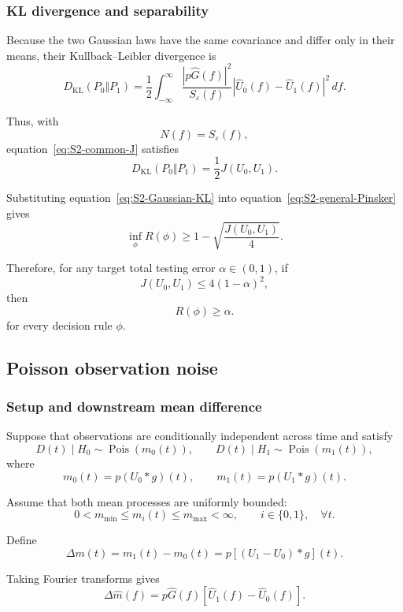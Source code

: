 \subsubsection{KL divergence and separability}

Because the two Gaussian laws have the same covariance and differ
only in their means, their Kullback--Leibler divergence is
\[
D_{\mathrm{KL}}(P_0\Vert P_1)
=
\frac{1}{2}
\int_{-\infty}^{\infty}
\frac{
|p\widehat G(f)|^2
}{
S_\varepsilon(f)
}
\left|
\widehat U_0(f)-\widehat U_1(f)
\right|^2
\,df.
\]

Thus, with
\[
N(f)=S_\varepsilon(f),
\]
equation~\eqref{eq:S2-common-J} satisfies
\begin{equation}
\label{eq:S2-Gaussian-KL}
D_{\mathrm{KL}}(P_0\Vert P_1)
=
\frac{1}{2}J(U_0,U_1).
\end{equation}

Substituting equation~\eqref{eq:S2-Gaussian-KL} into
equation~\eqref{eq:S2-general-Pinsker} gives
\[
\inf_{\phi}R(\phi)
\ge
1-
\sqrt{
\frac{J(U_0,U_1)}{4}
}.
\]

Therefore, for any target total testing error
\(\alpha\in(0,1)\), if
\begin{equation}
\label{eq:S2-Gaussian-threshold}
J(U_0,U_1)
\le
4(1-\alpha)^2,
\end{equation}
then
\[
R(\phi)\ge\alpha.
\]
for every decision rule $\phi$. 


\subsection{Poisson observation noise}

\subsubsection{Setup and downstream mean difference}

Suppose that observations are conditionally independent across time
and satisfy
\[
D(t)\mid H_0
\sim
\operatorname{Pois}\!\left(m_0(t)\right),
\qquad
D(t)\mid H_1
\sim
\operatorname{Pois}\!\left(m_1(t)\right),
\]
where
\[
m_0(t)=p(U_0*g)(t),
\qquad
m_1(t)=p(U_1*g)(t).
\]

Assume that both mean processes are uniformly bounded:
\[
0<m_{\min}
\le
m_i(t)
\le
m_{\max}
<\infty,
\qquad
i\in\{0,1\},
\quad
\forall t.
\]

Define
\[
\Delta m(t)
=
m_1(t)-m_0(t)
=
p[(U_1-U_0)*g](t).
\]

Taking Fourier transforms gives
\[
\Delta\widehat m(f)
=
p\widehat G(f)
\left[
\widehat U_1(f)-\widehat U_0(f)
\right].
\]

